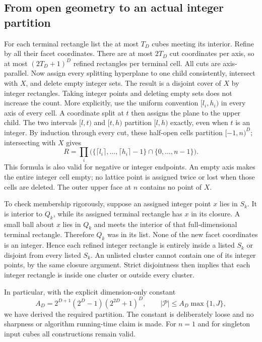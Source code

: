 \subsection{From open geometry to an actual integer partition}
For each terminal rectangle list the at most $T_D$ cubes meeting its
interior. Refine by all their facet coordinates. There are at most $2T_D$
cut coordinates per axis, so at most $(2T_D+1)^D$ refined rectangles per
terminal cell. All cuts are axis-parallel. Now assign every splitting
hyperplane to one child consistently, intersect with $X$, and delete empty
integer sets. The result is a disjoint cover of $X$ by integer rectangles.
Taking integer points and deleting empty sets does not increase the count.
More explicitly, use the uniform convention $[l_i,h_i)$ in every axis
of every cell. A coordinate split at $t$ then assigns the plane to the
upper child. The two intervals $[l,t)$ and $[t,h)$ partition $[l,h)$
exactly, even when $t$ is an integer. By induction through every cut,
these half-open cells partition $[-1,n)^D$; intersecting with $X$ gives
\[
 R=\prod_i\bigl(\{\lceil l_i\rceil,\ldots,\lceil h_i\rceil-1\}
                 \cap\{0,\ldots,n-1\}\bigr).
\]
This formula is also valid for negative or integer endpoints. An empty
axis makes the entire integer cell empty; no lattice point is assigned
twice or lost when those cells are deleted. The outer upper face at $n$
contains no point of $X$.

To check membership rigorously, suppose an assigned integer point $x$
lies in $S_k$. It is interior to $Q_k$, while its assigned terminal
rectangle has $x$ in its closure. A small ball about $x$ lies in $Q_k$
and meets the interior of that full-dimensional terminal rectangle.
Therefore $Q_k$ was in its list. None of the new facet coordinates is an
integer. Hence each refined integer rectangle is entirely inside a
listed $S_k$ or disjoint from every listed $S_k$. An unlisted cluster
cannot contain one of its integer points, by the same closure argument.
Strict disjointness then implies that each integer rectangle is inside
one cluster or outside every cluster.

In particular, with the explicit dimension-only constant
\begin{equation}\label{eq:explicit-final-size}
 A_D=2^{D+1}(2^D-1)(2^{2D}+1)^D,
 \qquad |\mathcal P|\leq A_D\max\{1,J\},
\end{equation}
we have derived the required partition. The constant is deliberately
loose and no sharpness or algorithm running-time claim is made.
For $n=1$ and for singleton input cubes all constructions remain valid.

